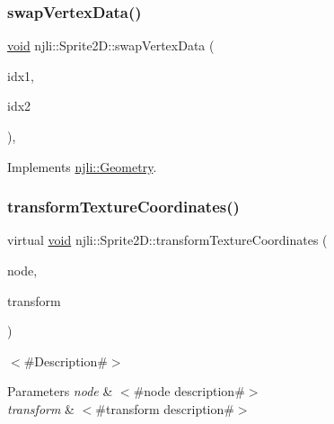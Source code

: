\mbox{\label{classnjli_1_1_sprite2_d_a310321527886b81f468aa818812a3347}} 
\subsubsection{\texorpdfstring{swap\+Vertex\+Data()}{swapVertexData()}}
{\footnotesize\ttfamily \mbox{\hyperlink{_thread_8h_af1e856da2e658414cb2456cb6f7ebc66}{void}} njli\+::\+Sprite2\+D\+::swap\+Vertex\+Data (\begin{DoxyParamCaption}\item[{const size\+\_\+t}]{idx1,  }\item[{const size\+\_\+t}]{idx2 }\end{DoxyParamCaption})\hspace{0.3cm}{\ttfamily [protected]}, {\ttfamily [virtual]}}



Implements \mbox{\hyperlink{classnjli_1_1_geometry_ac7ee1093062d2f342519f7914852a367}{njli\+::\+Geometry}}.

\mbox{\label{classnjli_1_1_sprite2_d_a61249eccaef1845855b6c1165bb1d1cf}} 
\subsubsection{\texorpdfstring{transform\+Texture\+Coordinates()}{transformTextureCoordinates()}}
{\footnotesize\ttfamily virtual \mbox{\hyperlink{_thread_8h_af1e856da2e658414cb2456cb6f7ebc66}{void}} njli\+::\+Sprite2\+D\+::transform\+Texture\+Coordinates (\begin{DoxyParamCaption}\item[{\mbox{\hyperlink{classnjli_1_1_node}{Node}} $\ast$}]{node,  }\item[{const bt\+Transform \&}]{transform }\end{DoxyParamCaption})\hspace{0.3cm}{\ttfamily [virtual]}}

$<$\#\+Description\#$>$


\begin{DoxyParams}{Parameters}
{\em node} & $<$\#node description\#$>$ \\
\hline
{\em transform} & $<$\#transform description\#$>$ \\
\hline
\end{DoxyParams}


